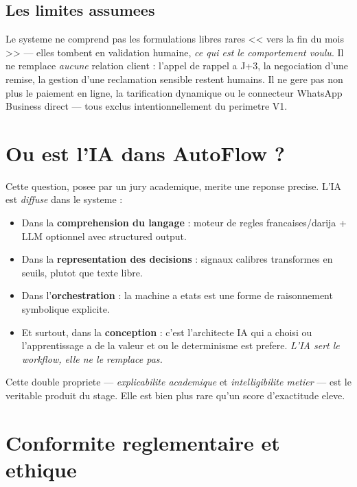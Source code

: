 \documentclass[12pt,a4paper,openany]{report}
\begin{document}
\subsection{Les limites assumees}
Le systeme ne comprend pas les formulations libres rares << vers la fin du mois >> --- elles tombent en validation humaine, \emph{ce qui est le comportement voulu}. Il ne remplace \emph{aucune} relation client : l'appel de rappel a J+3, la negociation d'une remise, la gestion d'une reclamation sensible restent humains. Il ne gere pas non plus le paiement en ligne, la tarification dynamique ou le connecteur WhatsApp Business direct --- tous exclus intentionnellement du perimetre V1.

\section{Ou est l'IA dans AutoFlow ?}

Cette question, posee par un jury academique, merite une reponse precise. L'IA est \emph{diffuse} dans le systeme :
\begin{itemize}[leftmargin=1.5cm]
\item Dans la \textbf{comprehension du langage} : moteur de regles francaises/darija + LLM optionnel avec structured output.
\item Dans la \textbf{representation des decisions} : signaux calibres transformes en seuils, plutot que texte libre.
\item Dans l'\textbf{orchestration} : la machine a etats est une forme de raisonnement symbolique explicite.
\item Et surtout, dans la \textbf{conception} : c'est l'architecte IA qui a choisi ou l'apprentissage a de la valeur et ou le determinisme est prefere. \emph{L'IA sert le workflow, elle ne le remplace pas.}
\end{itemize}

\begin{mechanismbox}
Cette double propriete --- \emph{explicabilite academique} et \emph{intelligibilite metier} --- est le veritable produit du stage. Elle est bien plus rare qu'un score d'exactitude eleve.
\end{mechanismbox}

\section{Conformite reglementaire et ethique}
\end{document}
